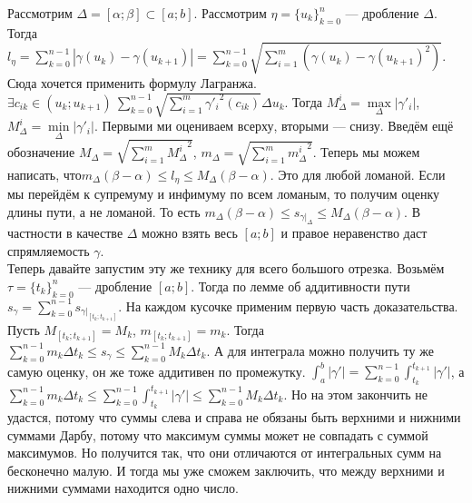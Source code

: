 \documentclass{article}
\begin{document}
\begin{itemize}
\begin{Proof}
            Рассмотрим $\Delta=[\alpha;\beta]\subset[a;b]$. Рассмотрим $\eta=\{u_k\}_{k=0}^n$ --- дробление $\Delta$. Тогда $l_\eta=\sum\limits_{k=0}^{n-1}|\gamma(u_k)-\gamma(u_{k+1})|=\sum\limits_{k=0}^{n-1}\sqrt{\sum\limits_{i=1}^m(\gamma(u_k)-\gamma(u_{k+1})^2)}$. Сюда хочется применить формулу Лагранжа. $\exists c_{ik}\in(u_k;u_{k+1})~\sum\limits_{k=0}^{n-1}\sqrt{\sum\limits_{i=1}^m{\gamma'_i}^2(c_{ik})}\Delta u_k$. Тогда $M_\Delta^i=\max\limits_\Delta|\gamma'_i|$, $M_\Delta^i=\min\limits_\Delta|\gamma'_i|$. Первыми ми оцениваем всерху, вторыми --- снизу. Введём ещё обозначение $M_\Delta=\sqrt{\sum\limits_{i=1}^m{M_\Delta^i}^2}$, $m_\Delta=\sqrt{\sum\limits_{i=1}^m{m_\Delta^i}^2}$. Теперь мы можем написать, что$m_\Delta(\beta-\alpha)\leqslant l_\eta\leqslant M_\Delta(\beta-\alpha)$. Это для любой ломаной. Если мы перейдём к супремуму и инфимуму по всем ломаным, то получим оценку длины пути, а не ломаной. То есть $m_\Delta(\beta-\alpha)\leqslant s_{\gamma|_{\Delta}}\leqslant M_\Delta(\beta-\alpha)$. В частности в качестве $\Delta$ можно взять весь $[a;b]$ и правое неравенство даст спрямляемость $\gamma$.\\
            Теперь давайте запустим эту же технику для всего большого отрезка. Возьмём $\tau=\{t_k\}_{k=0}^n$ --- дробление $[a;b]$. Тогда по лемме об аддитивности пути $s_\gamma=\sum\limits_{k=0}^{n-1}s_{\gamma\big|_{[t_k;t_{k+1}]}}$. На каждом кусочке применим первую часть доказательства. Пусть $M_{[t_k;t_{k+1}]}=M_k$, $m_{[t_k;t_{k+1}]}=m_k$. Тогда $\sum\limits_{k=0}^{n-1}m_k\Delta t_k\leqslant s_\gamma\leqslant\sum\limits_{k=0}^{n-1}M_k\Delta t_k$. А для интеграла можно получить ту же самую оценку, он же тоже аддитивен по промежутку. $\int_a^b|\gamma'|=\sum\limits_{k=0}^{n-1}\int_{t_k}^{t_{k+1}}|\gamma'|$, а $\sum\limits_{k=0}^{n-1}m_k\Delta t_k\leqslant\sum\limits_{k=0}^{n-1}\int_{t_k}^{t_{k+1}}|\gamma'|\leqslant\sum\limits_{k=0}^{n-1}M_k\Delta t_k$. Но на этом закончить не удастся, потому что суммы слева и справа не обязаны быть верхними и нижними суммами Дарбу, потому что максимум суммы может не совпадать с суммой максимумов. Но получится так, что они отличаются от интегральных сумм на бесконечно малую. И тогда мы уже сможем заключить, что между верхними и нижними суммами находится одно число.\\

\end{Proof}
\end{itemize}
\end{document}

